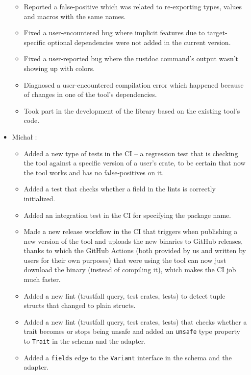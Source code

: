 \documentclass[licencjacka,en]{pracamgr}
\begin{document}
\begin{itemize}
\begin{itemize}
			\item Reported a false-positive which was related to re-exporting types, values
				and macros with the same names.
			\item Fixed a user-encountered bug where implicit features due to target-specific
				optional dependencies were not added in the current version.
			\item Fixed a user-reported bug where the rustdoc command's output wasn't showing up
				with colors.
			\item Diagnosed a user-encountered compilation error which happened because of changes
				in one of the tool's dependencies.
			\item Took part in the development of the library based on the existing tool's code.
		\end{itemize}

	\item Michał \cite{responsibilities-michal}:
		\begin{itemize}
			\item Added a new type of tests in the CI -- a regression test that is checking
				the tool against a specific version of a user's crate, to be certain that now
				the tool works and has no false-positives on it.
			\item Added a test that checks whether a field in the lints is correctly initialized.
			\item Added an integration test in the CI for specifying the package name.
			\item Made a new release workflow in the CI that triggers when publishing a new version
				of the tool and uploads the new binaries to GitHub releases, thanks to which
				the GitHub Actions (both provided by us and written by users for their own purposes)
				that were using the tool can now just download the binary (instead of compiling it),
				which makes the CI job much faster.
			\item Added a new lint (trustfall query, test crates, tests) to detect tuple structs
				that changed to plain structs.
			\item Added a new lint (trustfall query, test crates, tests) that checks whether
				a trait becomes or stops being unsafe and added an \texttt{unsafe} type property
				to \texttt{Trait} in the schema and the adapter.
			\item Added a \texttt{fields} edge to the \texttt{Variant} interface in the schema
				and the adapter.
		\end{itemize}


\end{itemize}
\end{document}
